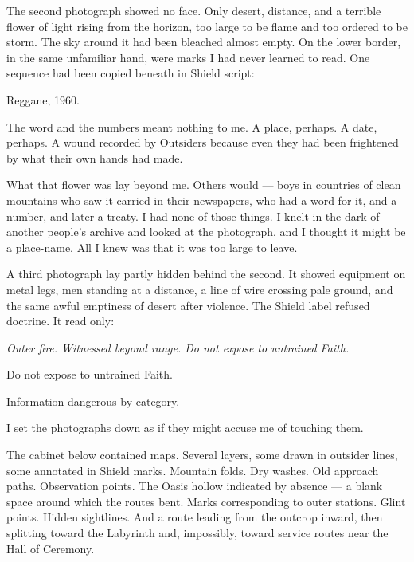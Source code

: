 \ornament


The second photograph showed no face. Only desert, distance, and a terrible flower of light rising from the horizon, too large to be flame and too ordered to be storm. The sky around it had been bleached almost empty. On the lower border, in the same unfamiliar hand, were marks I had never learned to read. One sequence had been copied beneath in Shield script:\par

Reggane, 1960.\par

The word and the numbers meant nothing to me. A place, perhaps. A date, perhaps. A wound recorded by Outsiders because even they had been frightened by what their own hands had made.\par

What that flower was lay beyond me. Others would --- boys in countries of clean mountains who saw it carried in their newspapers, who had a word for it, and a number, and later a treaty. I had none of those things. I knelt in the dark of another people's archive and looked at the photograph, and I thought it might be a place-name. All I knew was that it was too large to leave.\par

A third photograph lay partly hidden behind the second. It showed equipment on metal legs, men standing at a distance, a line of wire crossing pale ground, and the same awful emptiness of desert after violence. The Shield label refused doctrine. It read only:\par

\textit{Outer fire. Witnessed beyond range. Do not expose to untrained Faith.}\par

Do not expose to untrained Faith.\par

Information dangerous by category.\par

I set the photographs down as if they might accuse me of touching them.\par

The cabinet below contained maps. Several layers, some drawn in outsider lines, some annotated in Shield marks. Mountain folds. Dry washes. Old approach paths. Observation points. The Oasis hollow indicated by absence --- a blank space around which the routes bent. Marks corresponding to outer stations. Glint points. Hidden sightlines. And a route leading from the outcrop inward, then splitting toward the Labyrinth and, impossibly, toward service routes near the Hall of Ceremony.\par

